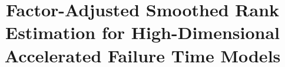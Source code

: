 \title{Factor-Adjusted Smoothed Rank Estimation for High-Dimensional Accelerated Failure Time Models}

\date{}
\maketitle

